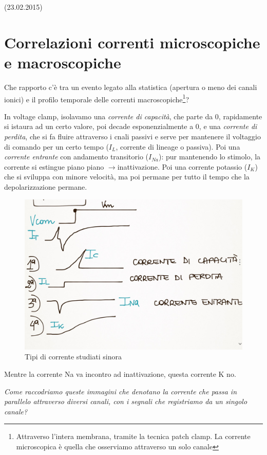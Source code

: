 \documentclass[a4paper,12pt]{article}
\newcommand{\lfreccia}{\ensuremath{\longrightarrow}}
\begin{document}
(23.02.2015)

\section{Correlazioni correnti microscopiche e macroscopiche}
Che rapporto c'è tra un evento legato alla statistica (apertura o meno dei canali ionici) e il profilo temporale delle correnti macroscopiche\footnote{Attraverso l'intera membrana, tramite la tecnica patch clamp. La corrente microscopica è quella che osserviamo attraverso un solo canale}?

In voltage clamp, isolavamo una \emph{corrente di capacità}, che parte da 0, rapidamente si istaura ad un certo valore, poi decade esponenzialmente a 0, e una \emph{corrente di perdita}, che si fa fluire attraverso i cnali passivi e serve per mantenere il voltaggio di comando per un certo tempo ($I_{L}$, corrente di lineage o passiva). Poi una \emph{corrente entrante }con andamento transitorio ($I_{Na}$): pur mantenendo lo stimolo, la corrente si estingue piano piano \lfreccia inattivazione. Poi una corrente potassio ($I_{K}$) che si sviluppa con minore velocità, ma poi permane per tutto il tempo che la depolarizzazione permane. 

\begin{figure}[H]
\centering
\includegraphics[scale=0.1]{immagine/16.jpg}
\caption{Tipi di corrente studiati sinora}
\label{img:corrente}
\end{figure} 

Mentre la corrente Na va incontro ad inattivazione, questa corrente K no.

\emph{Come raccodriamo queste immagini che denotano la corrente che passa \emph{in parallelo} attraverso diversi canali, con i segnali che registriamo da un singolo canale?}
\end{document}
